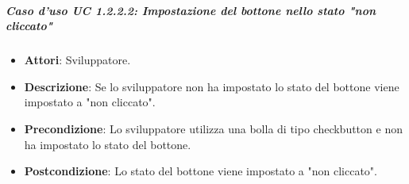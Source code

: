 \subparagraph{Caso d'uso UC 1.2.2.2: Impostazione del bottone nello stato "non cliccato"}
\label{UC 1.2.2.2: Impostazione del bottone nello stato "non cliccato"}

\FloatBarrier
\begin{itemize}
\item\textbf{Attori}: Sviluppatore.
\item\textbf{Descrizione}: Se lo sviluppatore non ha impostato lo stato del bottone viene impostato a "non cliccato".
\item\textbf{Precondizione}: Lo sviluppatore utilizza una bolla di tipo checkbutton e non ha impostato lo stato del bottone.
\item\textbf{Postcondizione}: Lo stato del bottone viene impostato a "non cliccato".
\end{itemize}
